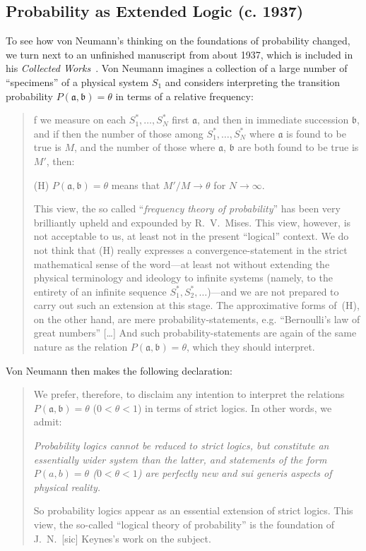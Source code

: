 \documentclass[aps,pra,superscriptaddress,12pt,tightenlines,nofootinbib]{revtex4-2}
\newcommand{\booktitle}{\textsl}
\begin{document}
\subsection{Probability as Extended Logic (c. 1937)}

To see how von Neumann's thinking on the foundations of probability
changed, we turn next to an unfinished manuscript from about 1937,
which is included in his \booktitle{Collected Works}~\cite{VN-CW}.  Von
Neumann imagines a collection of a large number of ``specimens'' of a
physical system $S_1$ and considers interpreting the transition
probability $P(\mathfrak{a},\mathfrak{b}) = \theta$ in terms of a
relative frequency:
\begin{quotation}
\noindent [I]f we measure on each $S_1^*,\ldots,S_N^*$ first
$\mathfrak{a}$, and then in immediate succession $\mathfrak{b}$, and
if then the number of those among $S_1^*,\ldots,S_N^*$ where
$\mathfrak{a}$ is found to be true is $M$, and the number of those
where $\mathfrak{a}$, $\mathfrak{b}$ are both found to be true is
$M'$, then:

(H) $P(\mathfrak{a}, \mathfrak{b}) = \theta$ means that $M'/M \to
\theta$ for $N \to \infty$.

This view, the so called ``\emph{frequency theory of probability}''
has been very brilliantly upheld and expounded by R.\ V.\ Mises.  This
view, however, is not acceptable to us, at least not in the present
``logical'' context.  We do not think that (H) really expresses a
convergence-statement in the strict mathematical sense of the
word---at least not without extending the physical terminology and
ideology to infinite systems (namely, to the entirety of an infinite
sequence $S_1^*, S_2^*, \ldots$)---and we are not prepared to carry
out such an extension at this stage.  The approximative forms of~(H),
on the other hand, are mere probability-statements, e.g. ``Bernoulli's
law of great numbers'' [\ldots\!] And such probability-statements are
again of the same nature as the relation $P(\mathfrak{a},\mathfrak{b})
= \theta$, which they should interpret.
\end{quotation} 
Von Neumann then makes the following declaration:
\begin{quotation}
We prefer, therefore, to disclaim any intention to interpret the
relations $P(\mathfrak{a},\mathfrak{b}) = \theta$ ($0 < \theta < 1$)
in terms of strict logics.  In other words, we admit:

\emph{Probability logics cannot be reduced to strict logics, but
  constitute an essentially wider system than the latter, and
  statements of the form $P(a,b) = \theta$ ($0 < \theta < 1$) are
  perfectly new and \emph{sui generis} aspects of physical reality.}

So probability logics appear as an essential extension of strict
logics.  This view, the so-called ``logical theory of probability'' is
the foundation of J.\ N.\ [sic] Keynes's work on the subject.
\end{quotation}
\end{document}
